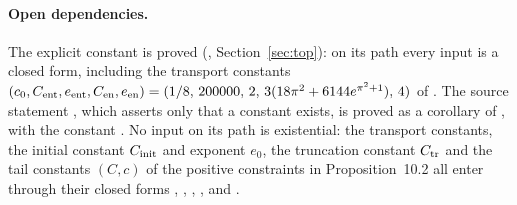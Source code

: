 \documentclass[11pt]{article}
\begin{document}
\paragraph{Open dependencies.}
\label{sec:open}
The explicit constant is proved
(, Section~\ref{sec:top}):
on its path every input is a closed form, including the transport constants
$(c_0,C_{\rm ent},e_{\rm ent},C_{\rm en},e_{\rm en})=(1/8,\,200000,\,2,\,
3(18\pi^2+6144e^{\pi^2+1}),\,4)$ of
.
The source statement , which
asserts only that a constant exists, is proved as a corollary of
, with the constant
. No input on its path
is existential: the transport constants, the initial constant $C_{\rm init}$
and exponent $e_0$, the truncation constant $C_{\rm tr}$ and the tail constants
$(C,c)$ of the positive constraints in Proposition~10.2 all enter through
their closed forms
,
,
,
,
 and
.
\end{document}
